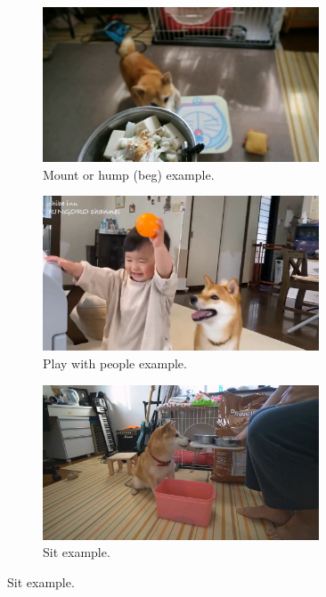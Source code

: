 \documentclass[letterpaper]{article}
\begin{document}
\begin{figure}[h]
\centering
\begin{subfigure}[]{0.3\textwidth}
	\centering
	\includegraphics[width=0.9\textwidth]{images/mountorhump(beg).jpg}
	\caption{Mount or hump (beg) example.}
	\label{fig:act1}
\end{subfigure}
\begin{subfigure}[]{0.3\textwidth}
	\centering
	\includegraphics[width=0.9\textwidth]{images/playwithpeople.jpg}
	\caption{Play with people example.}
	\label{fig:act2}
\end{subfigure}
\begin{subfigure}[]{0.3\textwidth}
	\centering
	\includegraphics[width=0.9\textwidth]{images/sit.jpg}
	\caption{Sit example.}
\label{fig:act3}
\end{subfigure}


\end{figure}
\end{document}
